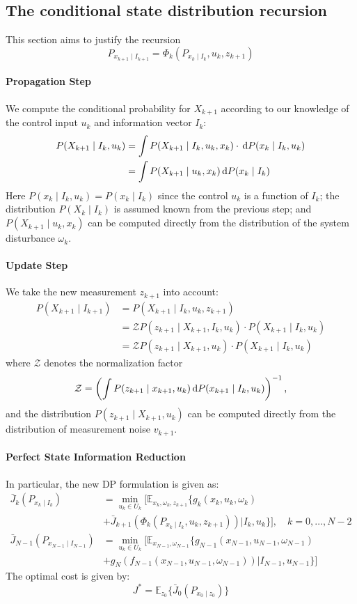 \subsection{The conditional state distribution recursion}
This section aims to justify the recursion
\[
P_{x_{k+1}\mid I_{k+1}}  = \Phi_k(P_{x_k\mid I_k},u_k,z_{k+1})
\]
\paragraph{Propagation Step}
We compute the conditional probability for $X_{k+1}$ according to our knowledge of the control input $u_k$ and information vector $I_k$:
\begin{align*}
P(X_{k+1}\mid I_k,u_k)&=\int P(X_{k+1}\mid I_k,u_k,x_k)\cdot\,\mathrm{d} P(x_k\mid I_k,u_k)\\
&=\int P(X_{k+1}\mid u_k,x_k)\,\mathrm{d} P(x_k\mid I_k)
\end{align*}
Here $P(x_k\mid I_k,u_k)=P(x_k\mid I_k)$ since the control $u_k$ is a function of $I_k$;
the distribution $P(X_k\mid I_k)$ is assumed known from the previous step;
and $P(X_{k+1}\mid u_k,x_k)$ can be computed directly from the distribution of the system disturbance $\omega_k$.
\paragraph{Update Step}
We take the new measurement $z_{k+1}$ into account:
\begin{align*}
P(X_{k+1}\mid I_{k+1})&=P(X_{k+1}\mid I_k,u_k,z_{k+1})\\
&=\mathcal{Z}P(z_{k+1}\mid X_{k+1},I_k,u_k)\cdot P(X_{k+1}\mid I_k,u_k)\\
&=\mathcal{Z}P(z_{k+1}\mid X_{k+1},u_k)\cdot P(X_{k+1}\mid I_k,u_k)
\end{align*}
where $\mathcal{Z}$ denotes the normalization factor
\[
\mathcal{Z}=
\left(
\int P(z_{k+1}\mid x_{k+1},u_k)\,\mathrm{d} P(x_{k+1}\mid I_k,u_k)
\right)^{-1},
\]
and the distribution $P(z_{k+1}\mid X_{k+1},u_k)$ can be computed directly from the distribution of measurement noise $v_{k+1}$.

\paragraph{Perfect State Information Reduction}
In particular, the new DP formulation is given as:
\begin{align*}
\bar{J}_k(P_{x_k\mid I_k})
&=
\min_{u_k\in U_k}\Bigg[
\mathbb{E}_{x_k,\omega_k,z_{k+1}}\Bigg\{g_k(x_k,u_k,\omega_k)\\
&+\bar{J}_{k+1}(\Phi_k(P_{x_k\mid I_k},u_k,z_{k+1}))\Bigg| I_k,u_k\Bigg\}\Bigg],\quad k=0,\dots,N-2\\
\bar{J}_{N-1}(P_{x_{N-1}\mid I_{N-1}})
&=
\min_{u_k\in U_k}\Bigg[
\mathbb{E}_{x_{N-1},\omega_{N-1}}\Bigg\{g_{N-1}(x_{N-1},u_{N-1},\omega_{N-1})\\
&+g_N(f_{N-1}(x_{N-1},u_{N-1},\omega_{N-1}))\Bigg|I_{N-1},u_{N-1}\Bigg\}\Bigg]
\end{align*}
The optimal cost is given by:
\[
J^*=\mathbb{E}_{z_0}\{\bar{J}_0(P_{x_0\mid z_0})\}
\]

